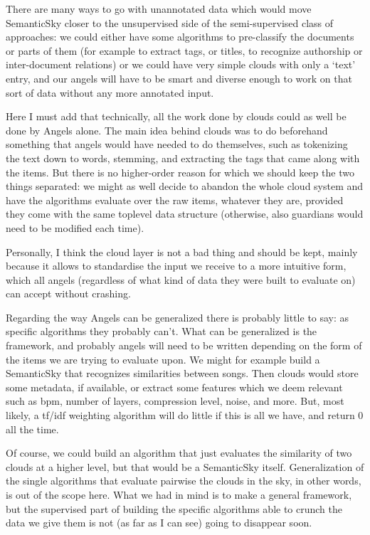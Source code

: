 \documentclass[11pt]{article}
\begin{document}
There are many ways to go with unannotated data which would move SemanticSky closer to the unsupervised side of the semi-supervised class of approaches: we could either have some algorithms to pre-classify the documents or parts of them (for example to extract tags, or titles, to recognize authorship or inter-document relations) or we could have very simple clouds with only a `text' entry, and our angels will have to be smart and diverse enough to work on that sort of data without any more annotated input.

Here I must add that technically, all the work done by clouds could as well be done by Angels alone. The main idea behind clouds was to do beforehand something that angels would have needed to do themselves, such as tokenizing the text down to words, stemming, and extracting the tags that came along with the items. But there is no higher-order reason for which we should keep the two things separated: we might as well decide to abandon the whole cloud system and have the algorithms evaluate over the raw items, whatever they are, provided they come with the same toplevel data structure (otherwise, also guardians would need to be modified each time).

Personally, I think the cloud layer is not a bad thing and should be kept, mainly because it allows to standardise the input we receive to a more intuitive form, which all angels (regardless of what kind of data they were built to evaluate on) can accept without crashing.

Regarding the way Angels can be generalized there is probably little to say: as specific algorithms they probably can't. What can be generalized is the framework, and probably angels will need to be written depending on the form of the items we are trying to evaluate upon. We might for example build a SemanticSky that recognizes similarities between songs. Then clouds would store some metadata, if available, or extract some features which we deem relevant such as bpm, number of layers, compression level, noise, and more. But, most likely, a tf/idf weighting algorithm will do little if this is all we have, and return 0 all the time.

Of course, we could build an algorithm that just evaluates the similarity of two clouds at a higher level, but that would be a SemanticSky itself. Generalization of the single algorithms that evaluate pairwise the clouds in the sky, in other words, is out of the scope here. What we had in mind is to make a general framework, but the supervised part of building the specific algorithms able to crunch the data we give them is not (as far as I can see) going to disappear soon.
\end{document}
